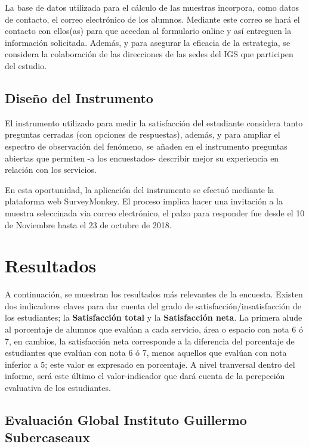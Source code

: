 \documentclass[]{book}
\begin{document}
La base de datos utilizada para el cálculo de las muestras incorpora,
como datos de contacto, el correo electrónico de los alumnos. Mediante
este correo se hará el contacto con ellos(as) para que accedan al
formulario online y así entreguen la información solicitada. Además, y
para asegurar la eficacia de la estrategia, se considera la colaboración
de las direcciones de las sedes del IGS que participen del estudio.

\section{Diseño del Instrumento}\label{diseno-del-instrumento}

El instrumento utilizado para medir la satisfacción del estudiante
considera tanto preguntas cerradas (con opciones de respuestas), además,
y para ampliar el espectro de observación del fenómeno, se añaden en el
instrumento preguntas abiertas que permiten -a los encuestados-
describir mejor su experiencia en relación con los servicios.

En esta oportunidad, la aplicación del instrumento se efectuó mediante
la plataforma web SurveyMonkey. El proceso implica hacer una invitación
a la muestra seleccinada via correo electrónico, el palzo para responder
fue desde el 10 de Noviembre hasta el 23 de octubre de 2018.

\chapter{Resultados}\label{resultados}

A continuación, se muestran los resultados más relevantes de la
encuesta. Existen dos indicadores claves para dar cuenta del grado de
satisfacción/insatisfacción de los estudiantes; la \textbf{Satisfacción
total} y la \textbf{Satisfacción neta}. La primera alude al porcentaje
de alumnos que evalúan a cada servicio, área o espacio con nota 6 ó 7,
en cambios, la satisfacción neta corresponde a la diferencia del
porcentaje de estudiantes que evalúan con nota 6 ó 7, menos aquellos que
evalúan con nota inferior a 5; este valor es expresado en porcentaje. A
nivel tranversal dentro del informe, será este último el valor-indicador
que dará cuenta de la percpeción evaluativa de los estudiantes.

\section{Evaluación Global Instituto Guillermo
Subercaseaux}\label{evaluacion-global-instituto-guillermo-subercaseaux}
\end{document}
